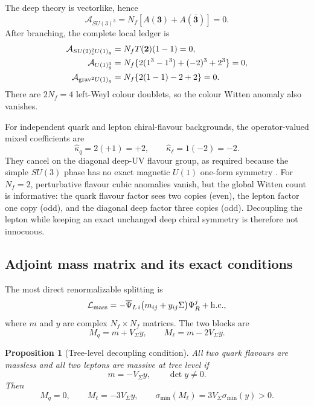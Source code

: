 \documentclass[11pt]{article}
\newtheorem{proposition}[theorem]{Proposition}
\theoremstyle{definition}
\theoremstyle{remark}
\begin{document}
The deep theory is vectorlike, hence
\begin{equation}
 \mathcal A_{SU(3)^3}=N_f[A(\bm3)+A(\overline{\bm3})]=0.
 \label{eq:su3-anomaly}
\end{equation}
After branching, the complete local ledger is
\begin{align}
 \mathcal A_{SU(2)_c^2U(1)_g}
 &=N_fT(\bm2)(1-1)=0,\notag\\
 \mathcal A_{U(1)_g^3}
 &=N_f\{2(1^3-1^3)+(-2)^3+2^3\}=0,\notag\\
 \mathcal A_{{\rm grav}^2U(1)_g}
 &=N_f\{2(1-1)-2+2\}=0.
 \label{eq:branched-anomalies}
\end{align}
There are \(2N_f=4\) left-Weyl colour doublets, so the colour Witten anomaly
also vanishes.

For independent quark and lepton chiral-flavour backgrounds, the
operator-valued mixed coefficients are
\begin{equation}
 \widehat\kappa_q=2(+1)=+2,\qquad
 \widehat\kappa_\ell=1(-2)=-2.
 \label{eq:kappa-cancellation}
\end{equation}
They cancel on the diagonal deep-UV flavour group, as required because the
simple \(SU(3)\) phase has no exact magnetic \(U(1)\) one-form symmetry
\cite{DavighiLohitsiri2024Global}.  For \(N_f=2\), perturbative flavour cubic
anomalies vanish, but the global Witten count is informative: the quark
flavour factor sees two copies (even), the lepton factor one copy (odd), and
the diagonal deep factor three copies (odd).  Decoupling the lepton while
keeping an exact unchanged deep chiral symmetry is therefore not innocuous.

\subsection{Adjoint mass matrix and its exact conditions}

The most direct renormalizable splitting is
\begin{equation}
 \mathcal L_{\rm mass}
 =-\overline\Psi_{L\,i}
 \bigl(m_{ij}+y_{ij}\Sigma\bigr)\Psi_R^j+{\rm h.c.},
 \label{eq:fermion-mass-lagrangian}
\end{equation}
where \(m\) and \(y\) are complex \(N_f\times N_f\) matrices.  The two
blocks are
\begin{equation}
 M_q=m+V_\Sigma y,\qquad
 M_\ell=m-2V_\Sigma y.
 \label{eq:mass-blocks}
\end{equation}

\begin{proposition}[Tree-level decoupling condition]
All two quark flavours are massless and all two leptons are massive at tree
level if
\begin{equation}
 m=-V_\Sigma y,\qquad \det y\ne0.
 \label{eq:fermion-tuning}
\end{equation}
Then
\begin{equation}
 M_q=0,\qquad
 M_\ell=-3V_\Sigma y,\qquad
 \sigma_{\min}(M_\ell)=3V_\Sigma\sigma_{\min}(y)>0.
 \label{eq:fermion-spectrum}
\end{equation}
\end{proposition}
\end{document}
